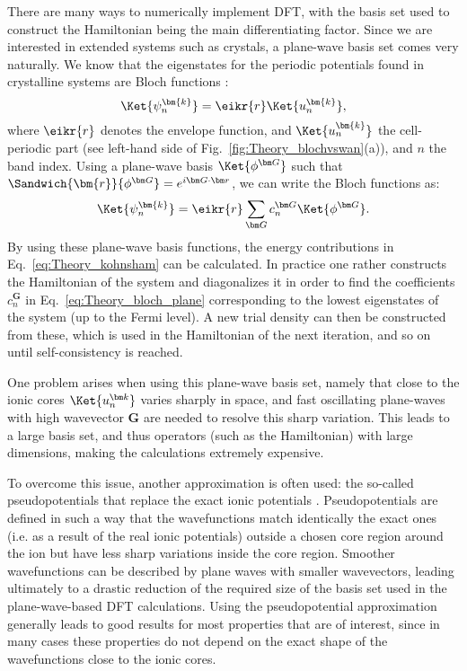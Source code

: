 There are many ways to numerically implement \gls{DFT}, with the basis set used to construct the Hamiltonian being the main differentiating factor.
Since we are interested in extended systems such as crystals, a plane-wave basis set comes very naturally.
We know that the eigenstates for the periodic potentials found in crystalline systems are Bloch functions \cite{Ashcroft}:
\begin{equation}
	\Ket{\psi^{\bm{k}}_n} = \eikr{r} \Ket{u^{\bm{k}}_n},
\end{equation}
where $\eikr{r}$ denotes the envelope function, and $\Ket{u^{\bm{k}}_n}$ the cell-periodic part (see left-hand side of Fig.~\ref{fig:Theory_blochvswan}(a)), and $n$ the band index.
Using a plane-wave basis $\Ket{\phi^{\bm G}}$ such that $\Sandwich{\bm{r}}{\phi^{\bm G}} = e^{i\bm G \cdot \bm r}$, we can write the Bloch functions as:
\begin{equation}
	\label{eq:Theory_bloch_plane}
\Ket{\psi_n^{\bm{k}}} = \eikr{r} \sum_{\bm G} c_n^{\bm G} \Ket{\phi^{\bm G}}.
\end{equation}
By using these plane-wave basis functions, the energy contributions in Eq.~\eqref{eq:Theory_kohnsham} can be calculated.
In practice one rather constructs the Hamiltonian of the system and diagonalizes it in order to find the coefficients $c_n^{\bm G}$ in Eq.~\eqref{eq:Theory_bloch_plane} corresponding to the lowest eigenstates of the system (up to the Fermi level).
A new trial density can then be constructed from these, which is used in the Hamiltonian of the next iteration, and so on until self-consistency is reached.

One problem arises when using this plane-wave basis set, namely that close to the ionic cores $\Ket{u_n^{\bm k}}$ varies sharply in space, and fast oscillating plane-waves with high wavevector $\bm G$ are needed to resolve this sharp variation.
This leads to a large basis set, and thus operators (such as the Hamiltonian) with large dimensions, making the calculations extremely expensive.

To overcome this issue, another approximation is often used: the so-called pseudopotentials that replace the exact ionic potentials \cite{Hamann1979,Louie1982,Vanderbilt1990,Joubert1999}.
Pseudopotentials are defined in such a way that the wavefunctions match identically the exact ones (i.e. as a result of the real ionic potentials) outside a chosen core region around the ion but have less sharp variations inside the core region.
Smoother wavefunctions can be described by plane waves with smaller wavevectors, leading ultimately to a drastic reduction of the required size of the basis set used in the plane-wave-based \gls{DFT} calculations.
Using the pseudopotential approximation generally leads to good results for most properties that are of interest, since in many cases these properties do not depend on the exact shape of the wavefunctions close to the ionic cores.

